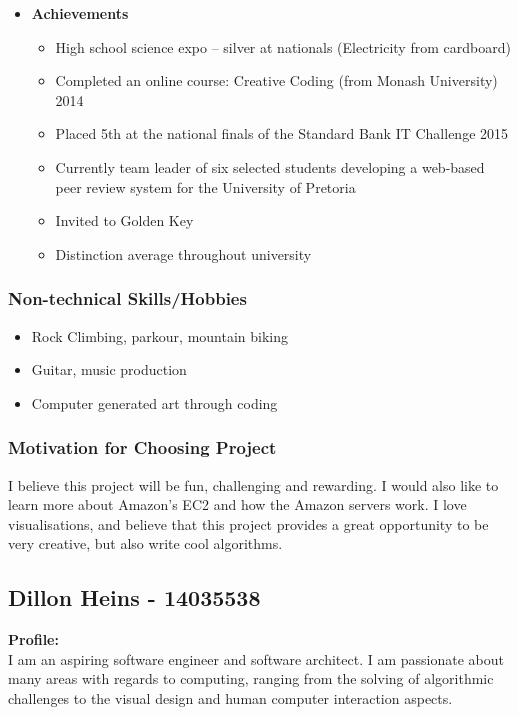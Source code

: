 \documentclass{article}
\begin{document}
\begin{itemize}
		\item \textbf{Achievements}
		\begin{itemize}
			\item High school science expo – silver at nationals (Electricity from cardboard)
			\item Completed an online course: Creative Coding (from Monash University) 2014
			\item Placed 5th at the national finals of the Standard Bank IT Challenge 2015
			\item Currently team leader of six selected students developing a web-based peer review system for the University of Pretoria
			\item Invited to Golden Key
			\item Distinction average throughout university
		\end{itemize}
	\end{itemize}
	
	\subsubsection{Non-technical Skills/Hobbies}
	\begin{itemize}
		\item Rock Climbing, parkour, mountain biking
		\item Guitar, music production
		\item Computer generated art through coding
	\end{itemize}
	\subsubsection{Motivation for Choosing Project}
	I believe this project will be fun, challenging and rewarding. I would also like to learn more about Amazon's EC2 and how the Amazon servers work. I love visualisations, and believe that this project provides a great opportunity to be very creative, but also write cool algorithms. 
	
	\cleardoublepage
	
	\subsection{Dillon Heins - 14035538}
	\textbf{Profile:}\\
	I am an aspiring software engineer and software architect. I am passionate about many areas with regards to computing, ranging from the solving of algorithmic challenges to the visual design and human computer interaction aspects.
	
\end{document}
